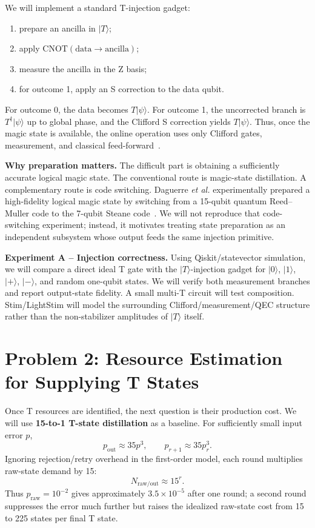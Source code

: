 \documentclass[10pt]{article}
\begin{document}
We will implement a standard T-injection gadget:
\begin{enumerate}
\item prepare an ancilla in $|T\rangle$;
\item apply $\mathrm{CNOT}(\mathrm{data}\rightarrow\mathrm{ancilla})$;
\item measure the ancilla in the Z basis;
\item for outcome 1, apply an S correction to the data qubit.
\end{enumerate}
For outcome 0, the data becomes $T|\psi\rangle$. For outcome 1, the uncorrected branch is $T^\dagger|\psi\rangle$ up to global phase, and the Clifford S correction yields $T|\psi\rangle$. Thus, once the magic state is available, the online operation uses only Clifford gates, measurement, and classical feed-forward~\cite{bravyi2005magic}.

\textbf{Why preparation matters.} The difficult part is obtaining a sufficiently accurate logical magic state. The conventional route is magic-state distillation. A complementary route is code switching. Daguerre \emph{et al.} experimentally prepared a high-fidelity logical magic state by switching from a 15-qubit quantum Reed--Muller code to the 7-qubit Steane code~\cite{daguerre2025codeswitch}. We will not reproduce that code-switching experiment; instead, it motivates treating state preparation as an independent subsystem whose output feeds the same injection primitive.

\textbf{Experiment A -- Injection correctness.} Using Qiskit/statevector simulation, we will compare a direct ideal T gate with the $|T\rangle$-injection gadget for $|0\rangle$, $|1\rangle$, $|+\rangle$, $|-\rangle$, and random one-qubit states. We will verify both measurement branches and report output-state fidelity. A small multi-T circuit will test composition. Stim/LightStim will model the surrounding Clifford/measurement/QEC structure rather than the non-stabilizer amplitudes of $|T\rangle$ itself.

\section{Problem 2: Resource Estimation for Supplying T States}

Once T resources are identified, the next question is their production cost. We will use \textbf{15-to-1 T-state distillation} as a baseline. For sufficiently small input error $p$,
\[
p_{\mathrm{out}}\approx 35p^3,\qquad p_{r+1}\approx 35p_r^3.
\]
Ignoring rejection/retry overhead in the first-order model, each round multiplies raw-state demand by 15:
\[
N_{\mathrm{raw/out}}\approx 15^r.
\]
Thus $p_{\mathrm{raw}}=10^{-2}$ gives approximately $3.5\times10^{-5}$ after one round; a second round suppresses the error much further but raises the idealized raw-state cost from 15 to 225 states per final T state.
\end{document}
